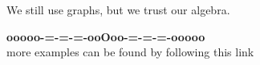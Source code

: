 \documentclass{ximera}
\begin{document}
We still use graphs, but we trust our algebra.










\begin{center}
\textbf{\textcolor{green!50!black}{ooooo-=-=-=-ooOoo-=-=-=-ooooo}} \\

more examples can be found by following this link\\ 

\end{center}
\end{document}

